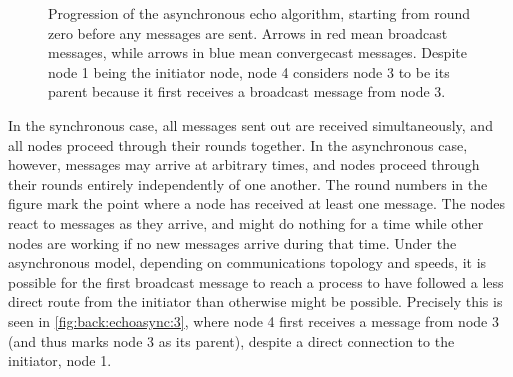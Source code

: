 \begin{figure}[htbp]
    \caption[Progression of the asynchronous \textsf{echo} algorithm]{Progression of the asynchronous \textsf{echo} algorithm, starting from round zero before any messages are sent.  Arrows in red mean broadcast messages, while arrows in blue mean convergecast messages.  Despite node 1 being the initiator node, node 4 considers node 3 to be its parent because it first receives a broadcast message from node 3.}
    \label{fig:back:echoasync}
\end{figure}

In the synchronous case, all messages sent out are received simultaneously, and all nodes proceed through their rounds together.  In the asynchronous case, however, messages may arrive at arbitrary times, and nodes proceed through their rounds entirely independently of one another.  The round numbers in the figure mark the point where a node has received at least one message.  The nodes react to messages as they arrive, and might do nothing for a time while other nodes are working if no new messages arrive during that time.  Under the asynchronous model, depending on communications topology and speeds, it is possible for the first broadcast message to reach a process to have followed a less direct route from the initiator than otherwise might be possible.  Precisely this is seen in \cref{fig:back:echoasync:3}, where node 4 first receives a message from node 3 (and thus marks node 3 as its parent), despite a direct connection to the initiator, node 1.